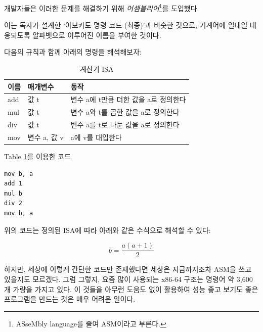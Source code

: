 \documentclass[a4paper,12pt]{book}
\begin{document}
개발자들은 이러한 문제를 해결하기 위해
\textit{어셈블리어}\footnote{ASseMbly language를 줄여 ASM이라고 부른다.}를 도입했다. 


이는 독자가 설계한 `아보카도 명령 코드 (최종)'과 비슷한 것으로,
기계어에 일대일 대응되도록 알파벳으로 이루어진 이름을 부여한 것이다.

다음의 규칙과 함께 아래의 명령을 해석해보자:

\begin{table}[!h]
    \centering

    \caption{계산기 ISA}
    \label{Tab:simple-calculator-isa}

    \begin{tabular}{ || m{2em} | m{5em} | m{22em} || }
        \hline
        이름 & 매개변수 & 동작 \\
        \hline\hline
        add  & 값 t & 변수 a에 t만큼 더한 값을 a로 정의한다 \\
        \hline
        mul  & 값 t & 변수 a와 t를 곱한 값을 a로 정의한다 \\
        \hline
        div  & 값 t & 변수 a를 t로 나눈 값을 a로 정의한다 \\
        \hline
        mov  & 변수 a, 값 v & a에 v를 대입한다 \\
        \hline
    \end{tabular}
\end{table}

\begin{center}

    \centering
    
    Table \ref{Tab:simple-calculator-isa}를 이용한 코드

\begin{lstlisting}
mov b, a
add 1
mul b
div 2
mov b, a
\end{lstlisting}
\end{center}

위의 코드는 정의된 ISA에 따라 아래와 같은 수식으로 해석할 수 있다:

\begin{equation}
b = \frac{a(a + 1)}{2}
\end{equation}

하지만, 세상에 이렇게 간단한 코드만 존재했다면 세상은 지금까지조차 ASM을
쓰고 있을지도 모르겠다.
그럼 그렇지, 요즘 많이 사용되는 x86-64 구조는 명령어 약 3,600개 가량을
가지고 있다.
이 것들을 아무런 도움도 없이 활용하여 성능 좋고 보기도 좋은 프로그램을
만드는 것은 매우 어려운 일이다.

\end{document}
